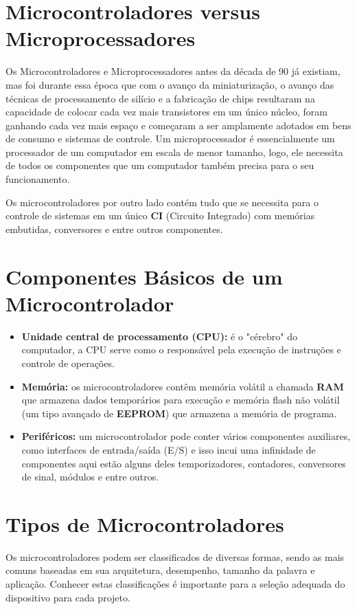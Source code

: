 \documentclass[12pt,a4paper]{book}
\begin{document}
\section{Microcontroladores versus Microprocessadores}
Os Microcontroladores e Microprocessadores antes da década de 90 já existiam, mas foi durante essa época que com o avanço da miniaturização, o avanço das técnicas de processamento de silício e a fabricação de chips resultaram na capacidade de colocar cada vez mais transistores em um único núcleo, foram ganhando cada vez mais espaço e começaram a ser amplamente adotados em bens de consumo e sistemas de controle. Um microprocessador é essencialmente um processador de um computador em escala de menor tamanho, logo, ele necessita de todos os componentes que um computador também precisa para o seu funcionamento.
\par
Os microcontroladores por outro lado contém tudo que se necessita para o controle de sistemas em um único \textbf{CI} (Circuito Integrado) com memórias embutidas, conversores e entre outros componentes.
\section{Componentes Básicos de um Microcontrolador}
\begin{itemize}
    \item \textbf{Unidade central de processamento (CPU):} é o "cérebro" do computador, a CPU serve como o responsável pela execução de instruções e controle de operações.
    \item \textbf{Memória:} os microcontroladores contêm memória volátil a chamada \textbf{RAM} que armazena dados temporários para execução e memória flash não volátil (um tipo avançado de \textbf{EEPROM}) que armazena a memória de programa.
    \item \textbf{Periféricos:} um microcontrolador pode conter vários componentes auxiliares, como interfaces de entrada/saída (E/S) e isso incui uma infinidade de componentes aqui estão alguns deles temporizadores, contadores, conversores de sinal, módulos e entre outros.
\end{itemize}
\section{Tipos de Microcontroladores}
Os microcontroladores podem ser classificados de diversas formas, sendo as mais comuns baseadas em sua arquitetura, desempenho, tamanho da palavra e aplicação. Conhecer estas classificações é importante para a seleção adequada do dispositivo para cada projeto.
\newpage
\end{document}
